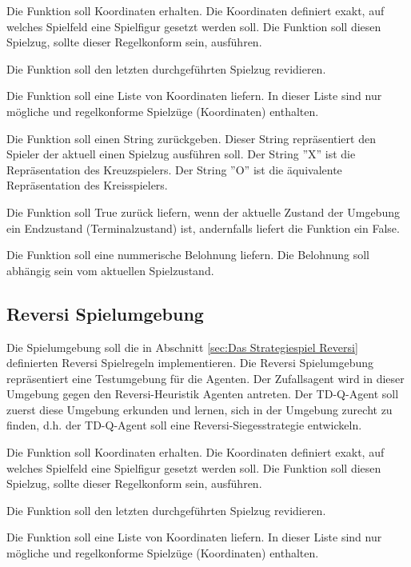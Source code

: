Die Funktion soll Koordinaten erhalten. Die Koordinaten definiert exakt, auf welches Spielfeld eine Spielfigur gesetzt werden soll. Die Funktion soll diesen Spielzug, sollte dieser Regelkonform sein, ausführen.

Die Funktion soll den letzten durchgeführten Spielzug revidieren.

Die Funktion soll eine Liste von Koordinaten liefern. In dieser Liste sind nur mögliche und regelkonforme Spielzüge (Koordinaten) enthalten.

Die Funktion soll einen String zurückgeben. Dieser String repräsentiert den Spieler der aktuell einen Spielzug ausführen soll. Der String ''X'' ist die Repräsentation des Kreuzspielers. Der String ''O'' ist die äquivalente Repräsentation des Kreisspielers.

Die Funktion soll True zurück liefern, wenn der aktuelle Zustand der Umgebung ein Endzustand (Terminalzustand) ist, andernfalls liefert die Funktion ein False.

Die Funktion soll eine nummerische Belohnung liefern. Die Belohnung soll abhängig sein vom aktuellen Spielzustand.

\subsection{Reversi Spielumgebung}
Die Spielumgebung soll die in Abschnitt \ref{sec:Das Strategiespiel Reversi} definierten Reversi Spielregeln implementieren. Die Reversi Spielumgebung repräsentiert eine Testumgebung für die Agenten. Der Zufallsagent wird in dieser Umgebung gegen den Reversi-Heuristik Agenten antreten. Der TD-Q-Agent soll zuerst diese Umgebung erkunden und lernen, sich in der Umgebung zurecht zu finden, d.h. der TD-Q-Agent soll eine Reversi-Siegesstrategie entwickeln. 

Die Funktion soll Koordinaten erhalten. Die Koordinaten definiert exakt, auf welches Spielfeld eine Spielfigur gesetzt werden soll. Die Funktion soll diesen Spielzug, sollte dieser Regelkonform sein, ausführen.

Die Funktion soll den letzten durchgeführten Spielzug revidieren.

Die Funktion soll eine Liste von Koordinaten liefern. In dieser Liste sind nur mögliche und regelkonforme Spielzüge (Koordinaten) enthalten.

